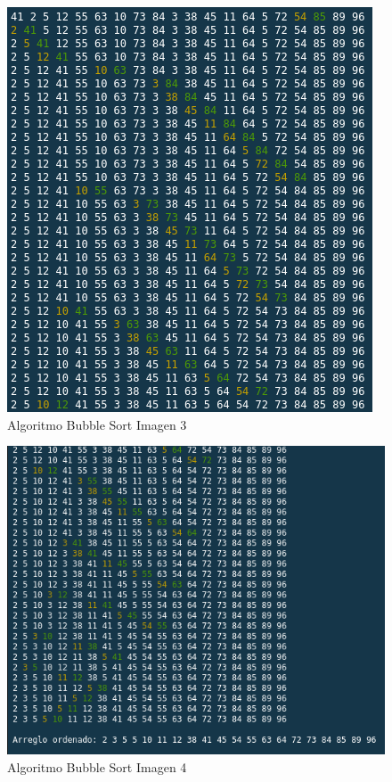 \documentclass{article}
\begin{document}
		\begin{figure}[H]
			\centering
			\includegraphics[scale = 1]{images/e3b3.png}
			\caption{Algoritmo Bubble Sort Imagen 3}
		\end{figure}
	
		\begin{figure}[H]
			\centering
			\includegraphics[scale = 0.8]{images/e3b4.png}
			\caption{Algoritmo Bubble Sort Imagen 4}
		\end{figure}
	\newpage
		
\end{document}
